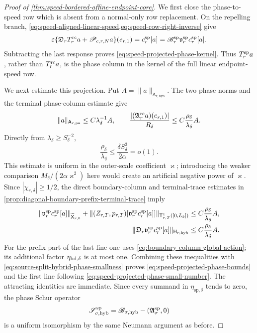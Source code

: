 \begin{proof}[Proof of
\cref{thm:speed-bordered-affine-endpoint-core}]
We first close the phase-to-speed row which is absent from a normal-only
row replacement.  On the repelling branch,
\cref{eq:speed-aligned-linear-speed,eq:speed-row-right-inverse} give
\[
 \varepsilon\{\mathfrak D_rT_r^{\rm rc}a
        +\mathscr P_{c,r,N}a\}(e_{r,1})
 =c_r^{\rm sp}[a]
 =\mathscr B_r^{\rm sp}
       \mathfrak v_r^{\rm sp}c_r^{\rm sp}[a].
\]
Subtracting the last response proves
\cref{eq:speed-projected-phase-kernel}.  Thus \(T_r^{\rm sp}a\), rather
than \(T_r^{\rm rc}a\), is the phase column in the kernel of the full
linear endpoint-speed row.

We next estimate this projection.  Put
\(A=\|a\|_{\mathsf A_{r,\mathrm{hyb}}}\).
The two phase norms and the terminal phase-column estimate give
\begin{equation}
 \|a\|_{\mathsf A_{r,\mathrm{pa}}}
 \le C\lambda_\delta^{-1}A,\qquad
 \frac{|(\mathfrak A_r^{\rm rc}a)(e_{r,1})|}{R_\delta}
 \le C\frac{\rho_\delta}{\lambda_\delta}A.       \label{eq:proof-speed-phase-endpoint-column}
\end{equation}
Directly from \(\lambda_\delta\ge S_\delta^{-2}\),
\begin{equation}
 \frac{\rho_\delta}{\lambda_\delta}
 \le\frac{\delta S_\delta^3}{2\alpha}=o(1).      \label{eq:proof-speed-phase-uniform-ratio}
\end{equation}
This estimate is uniform in the outer-scale coefficient \(\varkappa\);
introducing the weaker comparison
\(M_\delta/(2\alpha\varkappa^2)\) here would create an artificial
negative power of \(\varkappa\).
Since \(|\chi_{r,\delta}|\ge1/2\), the direct boundary-column and
terminal-trace estimates in
\cref{prop:diagonal-boundary-prefix-terminal-trace} imply
\begin{align}
 \|\mathfrak v_r^{\rm sp}c_r^{\rm sp}[a]\|_
       {\widetilde{\mathsf X}_{r,0}}
 +\|(Z_{r,T},p_{r,T})
       [\mathfrak v_r^{\rm sp}c_r^{\rm sp}[a]]\|_
       {\mathsf T_{r,T}^1([0,L_b])}
 &\le C\frac{\rho_\delta}{\lambda_\delta}A,
                                                        \label{eq:proof-speed-phase-column-state}\\
 \|\mathfrak D_r\mathfrak v_r^{\rm sp}
          c_r^{\rm sp}[a]\|_{\mathsf H_{r,\mathrm{hyb}}}
 &\le C\frac{\rho_\delta}{\lambda_\delta}A.      \label{eq:proof-speed-phase-column-action}
\end{align}
For the prefix part of the last line one uses
\cref{eq:boundary-column-global-action}; its additional factor
\(\eta_{{\rm bd},\delta}\) is at most one.  Combining these inequalities
with
\cref{eq:source-split-hybrid-phase-smallness} proves
\cref{eq:speed-projected-phase-bounds} and the first line following
\cref{eq:speed-projected-phase-small-number}.  The attracting identities
are immediate.  Since every summand in
\(\eta_{\mathrm{sp},\delta}\) tends to zero, the phase Schur operator
\[
 \mathscr S_{\sigma,\mathrm{hyb}}^{\rm sp}
 =\mathscr B_{\sigma,\mathrm{hyb}}
       -(\mathfrak A_\sigma^{\rm sp},0)
\]
is a uniform isomorphism by the same Neumann argument as before.


\end{proof}
